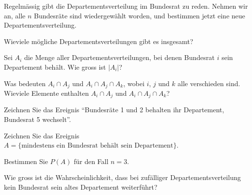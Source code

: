 Regelmässig gibt die Departementsverteilung im Bundesrat zu reden.
Nehmen wir an, alle $n$ Bundesräte sind wiedergewählt worden,
und bestimmen jetzt eine neue Departementsverteilung.
\begin{teilaufgaben}
\item Wieviele mögliche Departementsverteilungen gibt es insgesamt?
\item Sei $A_i$ die Menge aller Departementsverteilungen, bei denen
Bundesrat $i$ sein Departement behält. Wie gross ist $|A_i|$?
\item Was bedeuten $A_i\cap A_j$ und $A_i\cap A_j\cap A_k$,
wobei $i$, $j$ und $k$ alle verschieden sind. Wieviele Elemente
enthalten $A_i\cap A_j$ und $A_i\cap A_j\cap A_k$?
\item Zeichnen Sie das Ereignis ``Bundesräte 1 und 2 behalten ihr Departement,
Bundesrat 5 wechselt''.
\item Zeichnen Sie das Ereignis $A=\{\text{mindestens ein Bundesrat behält sein Departement}\}$.
\item Bestimmen Sie $P(A)$ für den Fall $n=3$.
\item Wie gross ist die Wahrscheinlichkeit, dass bei zufälliger
Departementsverteilung kein Bundesrat sein altes Departement weiterführt?
\end{teilaufgaben}


